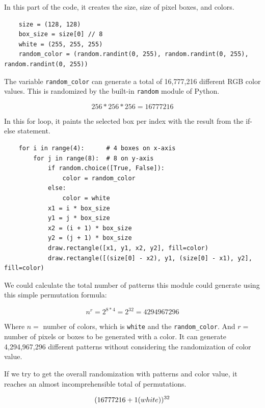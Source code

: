 \documentclass[12pt,a4paper]{article}
\begin{document}
            \hfill{}

            In this part of the code, it creates the size, size of pixel boxes, 
            and colors.

            \begin{lstlisting}
    size = (128, 128)
    box_size = size[0] // 8
    white = (255, 255, 255)
    random_color = (random.randint(0, 255), random.randint(0, 255), random.randint(0, 255))
            \end{lstlisting}

            The variable \texttt{random\_color} can generate a total of 16,777,216 
            different RGB color values. This is randomized by the built-in 
            \texttt{random} module of Python.

            $$256 * 256 * 256 = 16777216$$

            In this for loop, it paints the selected box per index with the result 
            from the if-else statement.
            \begin{lstlisting}
    for i in range(4):      # 4 boxes on x-axis
        for j in range(8):  # 8 on y-axis
            if random.choice([True, False]):
                color = random_color
            else:
                color = white
            x1 = i * box_size
            y1 = j * box_size
            x2 = (i + 1) * box_size
            y2 = (j + 1) * box_size
            draw.rectangle([x1, y1, x2, y2], fill=color)
            draw.rectangle([(size[0] - x2), y1, (size[0] - x1), y2], fill=color)
            \end{lstlisting}

            We could calculate the total number of patterns this module
            could generate using this simple permutation formula:

            $$n^{r} = 2^{8 * 4} = 2^{32} = 4294967296$$

            Where $n =$ number of colors, which is \texttt{white} and the 
            \texttt{random\_color}. And $r =$ number of pixels or boxes to be 
            generated with a color. It can generate 4,294,967,296 different patterns without considering the randomization of color value.

            \hfill{} 

            If we try to get the overall randomization with patterns and color value, 
            it reaches an almost incomprehensible total of permutations.

            $$(16777216 + 1 (\normalfont{white}))^{32}$$
\end{document}
